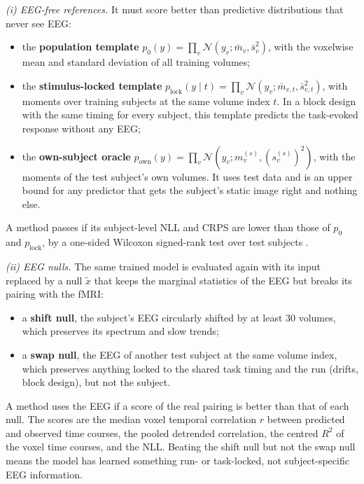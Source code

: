 \emph{(i) EEG-free references.} It must score better than predictive distributions that never see EEG:
\begin{itemize}
	\item the \textbf{population template} $p_0(y) = \prod_v \mathcal{N}(y_v; \bar m_v, \bar s_v^2)$, with the voxelwise mean and standard deviation of all training volumes;
	\item the \textbf{stimulus-locked template} $p_{\mathrm{lock}}(y\mid t) = \prod_v\mathcal{N}(y_v; \bar m_{v,t}, \bar s^2_{v,t})$, with moments over training subjects at the same volume index $t$. In a block design with the same timing for every subject, this template predicts the task-evoked response without any EEG;
	\item the \textbf{own-subject oracle} $p_{\mathrm{own}}(y) = \prod_v \mathcal{N}(y_v; m^{(s)}_v, (s^{(s)}_v)^2)$, with the moments of the test subject's own volumes. It uses test data and is an upper bound for any predictor that gets the subject's static image right and nothing else.
\end{itemize}
A method passes if its subject-level NLL and CRPS are lower than those of $p_0$ and $p_{\mathrm{lock}}$, by a one-sided Wilcoxon signed-rank test over test subjects \citep{wilcoxon1945individual}.

\emph{(ii) EEG nulls.} The same trained model is evaluated again with its input replaced by a null $\tilde x$ that keeps the marginal statistics of the EEG but breaks its pairing with the fMRI:
\begin{itemize}
	\item a \textbf{shift null}, the subject's EEG circularly shifted by at least 30 volumes, which preserves its spectrum and slow trends;
	\item a \textbf{swap null}, the EEG of another test subject at the same volume index, which preserves anything locked to the shared task timing and the run (drifts, block design), but not the subject.
\end{itemize}
A method uses the EEG if a score of the real pairing is better than that of each null. The scores are the median voxel temporal correlation $r$ between predicted and observed time courses, the pooled detrended correlation, the centred $R^2$ of the voxel time courses, and the NLL. Beating the shift null but not the swap null means the model has learned something run- or task-locked, not subject-specific EEG information.

